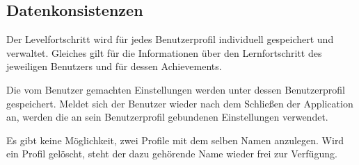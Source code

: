 \subsection{Datenkonsistenzen}

\begin{requirements}
  		
   Der Levelfortschritt wird für jedes Benutzerprofil individuell gespeichert und verwaltet. Gleiches gilt für die Informationen über den Lernfortschritt des jeweiligen Benutzers und für dessen Achievements.
  		
	 Die vom Benutzer gemachten Einstellungen werden unter dessen Benutzerprofil gespeichert. Meldet sich der Benutzer wieder nach dem Schließen der Application an, werden die an sein Benutzerprofil gebundenen Einstellungen verwendet.
	
	 Es gibt keine Möglichkeit, zwei Profile mit dem selben Namen anzulegen. Wird ein Profil gelöscht, steht der dazu gehörende Name wieder frei zur Verfügung.

\end{requirements}	
